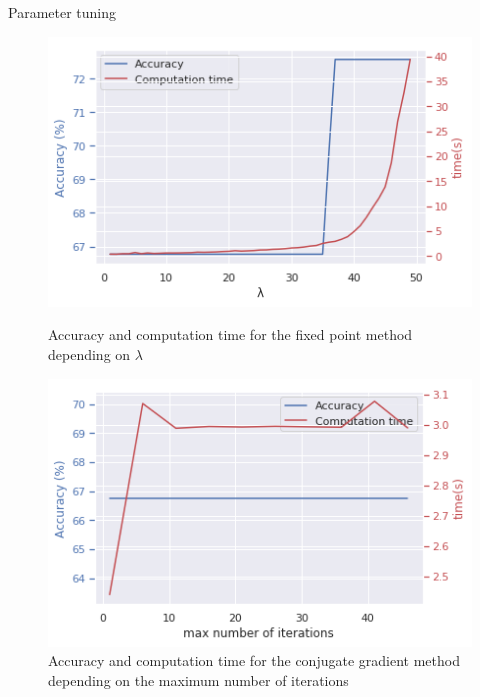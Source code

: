 \documentclass[compress]{beamer}
\begin{document}
\begin{frame}{Parameter tuning}
	\begin{multicols}{2}
		\begin{figure}
			\includegraphics[width=\linewidth]{data/fixed_point/acc_comp_time_fct_lambda.png}
			\caption*{Accuracy and computation time for the fixed point method depending on $\lambda$}
			\includegraphics[width=\linewidth]{data/conj_grad/acc_time_fct_iter.png}
			\caption*{Accuracy and computation time for the conjugate gradient method depending on the maximum number of iterations}
		\end{figure}
	\end{multicols}
\end{frame}
\end{document}
